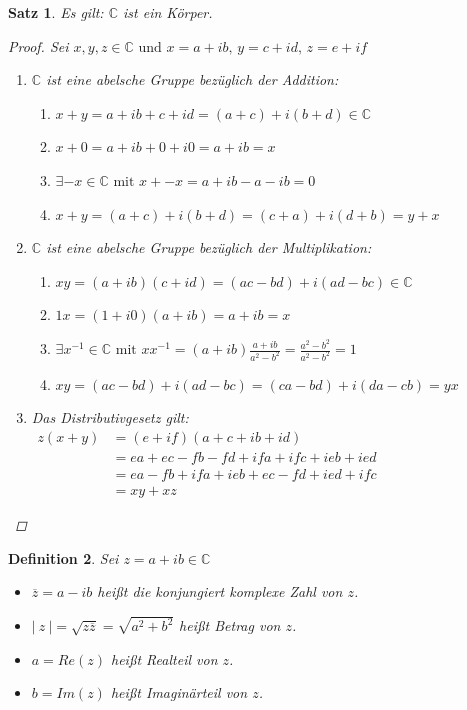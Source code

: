 \documentclass[a4paper,titlepage,oneside]{article}
\def\C{\ensuremath{\mathbb{C}} }
\def\im{\ensuremath{\mathit{i}} }
\newcommand{\abs}[1]{\ensuremath{\left|\:#1\:\right|}}
\theoremstyle{thmstyle}
\newtheorem{satz}{Satz}[section]
\newtheorem{defi}[satz]{Definition}
\theoremstyle{subthmstyle}
\begin{document}
\begin{satz}
Es gilt:  \C ist ein Körper.
\begin{proof} Sei \( x,y,z \in \C \text{ und } x = a + \im b,\, y = c + \im d,\, z = e + \im f \)
\begin{enumerate}[label=\Roman*)]
\item \C ist eine abelsche Gruppe bezüglich der Addition:
\begin{enumerate}[label=\roman*)]
\item \( x + y = a + \im b + c + \im d = (a+c) + \im (b + d) \in \C\)
\item \(x + 0 = a + \im b + 0 + \im 0 = a + \im b = x \)
\item \( \exists -x \in \C \text{ mit } x + -x = a + \im b - a -\im b = 0 \)
\item \( x+y =  (a+c) + \im (b + d) =  (c + a) + \im (d + b) = y + x \)
\end{enumerate}
\item \C ist eine abelsche Gruppe bezüglich der Multiplikation:
\begin{enumerate}[label=\roman*)]
\item \( xy = (a + \im b)(c + \im d) = (ac - bd) + \im (ad - bc) \in \C\)
\item \( 1x = (1+\im 0)(a + \im b ) = a + \im b = x \)
\item $\displaystyle \exists x^{-1} \in \C \text{ mit } xx^{-1} = (a + \im b)\frac{a + \im b}{a^2 - b^2} = \frac{a^2 - b^2}{a^2 - b^2} = 1$
\item \( xy = (ac - bd) + \im (ad - bc) = (ca - bd) + \im (da - cb) = yx\)
\end{enumerate}
\item Das Distributivgesetz gilt:\\
 \begin{math}\begin{aligned} z (x + y) &= (e + \im f)( a+c + \im b + \im d) \\
 &= ea + ec - fb - fd + \im fa +\im fc + \im eb + \im ed \\
 &= ea - fb + \im fa + \im eb + ec - fd + \im ed + \im fc \\
 &= xy + xz\end{aligned}\end{math}
\end{enumerate}
\end{proof}
\end{satz}

\begin{defi}
Sei \( z = a + \im b \in \C \)
\begin{itemize}
\item \(\overline{z} = a - \im b \) heißt die konjungiert komplexe Zahl von $z$.
\item $\displaystyle\abs{z} = \sqrt{z \overline{z}} = \sqrt{a^2 + b^2}$ heißt Betrag von \(z\).
\item $a = Re(z)$ heißt Realteil von $z$.
\item $b = Im(z)$ heißt Imaginärteil von $z$.
\end{itemize}
\end{defi}
\end{document}
